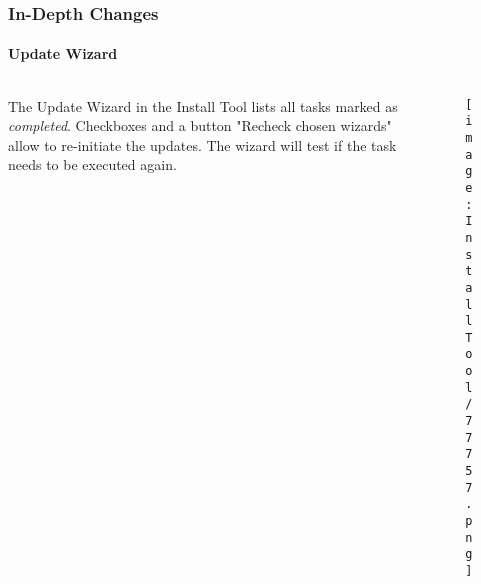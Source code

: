 \begin{frame}[fragile]
	\frametitle{In-Depth Changes}
	\framesubtitle{Update Wizard}

	\begin{columns}[T]
		\begin{column}{.5\textwidth}
			The Update Wizard in the Install Tool lists all tasks marked as \textit{completed}.
			\newline\newline
			Checkboxes and a button "Recheck chosen wizards" allow to re-initiate the updates.
			The wizard will test if the task needs to be executed again.
		\end{column}
		\begin{column}{.5\textwidth}
			\begin{figure}\vspace*{-0.5cm}
				\texttt{[image: InstallTool/77757.png]}
			\end{figure}
		\end{column}
	\end{columns}

\end{frame}


